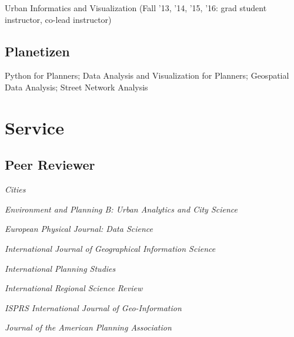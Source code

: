 \documentclass[12pt,letterpaper]{report}
\newcommand{\listitemspace}{0.15em}
\renewenvironment{itemize}
{\begin{list}{}{\setlength{\leftmargin}{0em}
			\setlength{\parskip}{0em}
			\setlength{\itemsep}{\listitemspace}
			\setlength{\parsep}{\listitemspace}}}
	{\end{list}}
\begin{document}
\begin{tablist}
	\begin{itemize}
		
		\item Urban Informatics and Visualization (Fall '13, '14, '15, '16: grad student instructor, co-lead instructor)
		
	\end{itemize}
	
	\subsection*{Planetizen}
	
	\begin{itemize}
		
		\item Python for Planners; Data Analysis and Visualization for Planners; Geospatial Data Analysis; Street Network Analysis
		
	\end{itemize}
	
	
	\section*{Service}
	
	\subsection*{Peer Reviewer}
	
	\begin{itemize}
		
		\item \textit{Cities}
		
		\item \textit{Environment and Planning B: Urban Analytics and City Science}
		
		\item \textit{European Physical Journal: Data Science}
		
		\item \textit{International Journal of Geographical Information Science}
		
		\item \textit{International Planning Studies}

		\item \textit{International Regional Science Review}
		
		\item \textit{ISPRS International Journal of Geo-Information}
		
		\item \textit{Journal of the American Planning Association}
		

\end{itemize}
\end{tablist}
\end{document}
